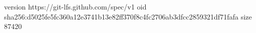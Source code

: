 version https://git-lfs.github.com/spec/v1
oid sha256:d5025fe5fc360a12e3741b13e82ff370f8c4fc2706ab3dfcc2859321df71fafa
size 87420
